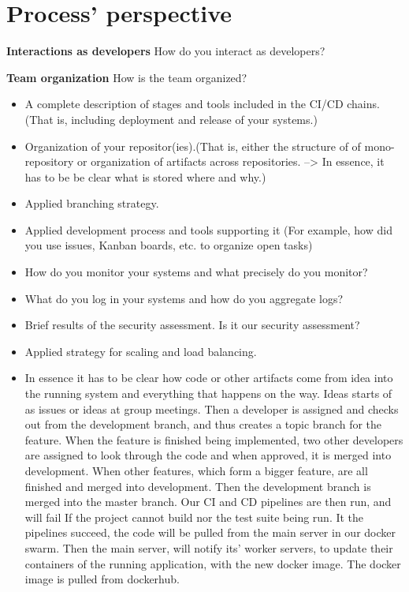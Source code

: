 \section{Process' perspective}

\textbf{Interactions as developers}\newline
 How do you interact as developers?\newline
 
\newline
\textbf{Team organization}\newline
  How is the team organized?\newline
  \begin{itemize}
  \item A complete description of stages and tools included in the CI/CD chains.(That is, including deployment and release of your systems.)
  \item Organization of your repositor(ies).(That is, either the structure of of mono-repository or organization of artifacts across repositories. --> In essence, it has to be be clear what is stored where and why.)
  \item Applied branching strategy.
  \item Applied development process and tools supporting it (For example, how did you use issues, Kanban boards, etc. to organize open tasks)
  \item How do you monitor your systems and what precisely do you monitor?
  \item What do you log in your systems and how do you aggregate logs?
  \item Brief results of the security assessment.
        Is it our security assessment?
  \item Applied strategy for scaling and load balancing.
  \item In essence it has to be clear how code or other artifacts come from idea into the running system and everything that happens on the way.
        Ideas starts of as issues or ideas at group meetings.
        Then a developer is assigned and checks out from the development branch,
        and thus creates a topic branch for the feature.
        When the feature is finished being implemented, 
        two other developers are assigned to look through
        the code and when approved, it is merged into development.
        When other features, which form a bigger feature, are all finished and merged into development.
        Then the development branch is merged into the master branch.
        Our CI and CD pipelines are then run, and will fail 
        If the project cannot build nor the test suite being run.
        It the pipelines succeed, the code will be pulled from 
        the main server in our docker swarm.
        Then the main server, will notify its' worker servers,
        to update their containers of the running application,
        with the new docker image. The docker image is pulled from dockerhub.
        
  
\end{itemize}